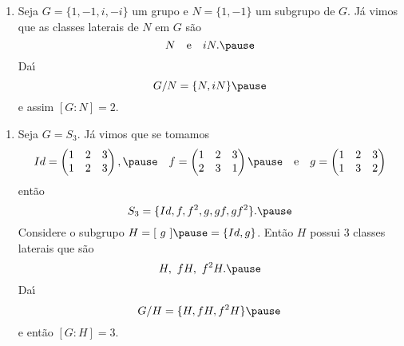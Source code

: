 \documentclass{beamer}
\begin{document}
    \begin{frame}
        \begin{exemplos}
            \begin{enumerate}[label=({\arabic*})]
                \item Seja $G = \{1, -1, i, -i\}$ um grupo \pause e $N = \{1, -1\}$ \pause um subgrupo de $G$. \pause Já vimos que as classes laterais de $N$ em $G$ são \pause
                \[
                    N \quad \mbox{e}\quad iN. \pause
                \]
                Da{\'\i}
                \[
                    G/N = \{N, iN\} \pause
                \]
                e assim $[G : N] = 2$.

                \seti
            \end{enumerate}
        \end{exemplos}
    \end{frame}

    \begin{frame}
        \begin{exemplos}
            \begin{enumerate}[label=({\arabic*})]
                \conti

                \item Seja $G = S_3$. \pause Já vimos que se tomamos
                \[
                    Id = \begin{pmatrix}
                        1 & 2 & 3\\
                        1 & 2 & 3
                    \end{pmatrix}, \pause\quad
                    f = \begin{pmatrix}
                        1 & 2 & 3\\
                        2 & 3 & 1
                    \end{pmatrix} \pause \quad \mbox{e}\quad
                    g = \begin{pmatrix}
                        1 & 2 & 3\\
                        1 & 3 & 2
                    \end{pmatrix}
                \]
                então
                \[
                    S_3 = \{Id, f, f^2, g, gf, gf^2\}. \pause
                \]
                Considere o subgrupo $H = [\ g\ ] \pause = \{Id, g\}$. Então $H$ possui 3 classes laterais que são
                \[
                    H,\ fH,\ f^2H. \pause
                \]
                Da{\'\i}
                \[
                    G/H = \{H, fH, f^2H\} \pause
                \]
                e então $[G : H] = 3$.
            \end{enumerate}
        \end{exemplos}
    \end{frame}
\end{document}
